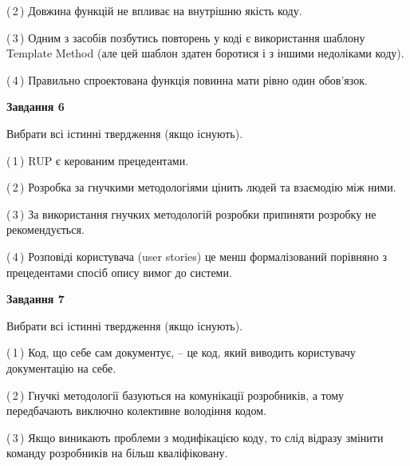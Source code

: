 \documentclass[10pt, ukrainian]{article}
\begin{document}
{\begin {large}
(\,2\,) Довжина функцій не впливає на внутрішню якість коду. %



(\,3\,) Одним з засобів позбутись повторень у коді є використання шаблону Template Method (але цей шаблон здатен боротися і з іншими недоліками коду). %



(\,4\,) Правильно спроектована функція повинна мати рівно один обов'язок. %

\newpage

{\begin {center}\textbf{Завдання 6}\end {center}}\par
Вибрати всі істинні твердження (якщо існують).\par
\vspace{2mm}



(\,1\,) RUP є керованим прецедентами. %



(\,2\,) Розробка за гнучкими методологіями цінить людей та взаємодію між ними. %



(\,3\,) За використання гнучких методологій розробки припиняти розробку не рекомендується. %



(\,4\,) Розповіді користувача (user stories) це менш формалізований порівняно з прецедентами спосіб опису вимог до системи. %


{\begin {center}\textbf{Завдання 7}\end {center}}\par
Вибрати всі істинні твердження (якщо існують).\par
\vspace{2mm}



(\,1\,) Код, що себе сам документує, -- це код, який виводить користувачу документацію на себе. %



(\,2\,) Гнучкі методології базуються на комунікації розробників, а тому передбачають виключно колективне володіння кодом. %



(\,3\,) Якщо виникають проблеми з модифікацією коду, то слід відразу змінити команду розробників на більш кваліфіковану.%




\end{large}}
\end{document}
